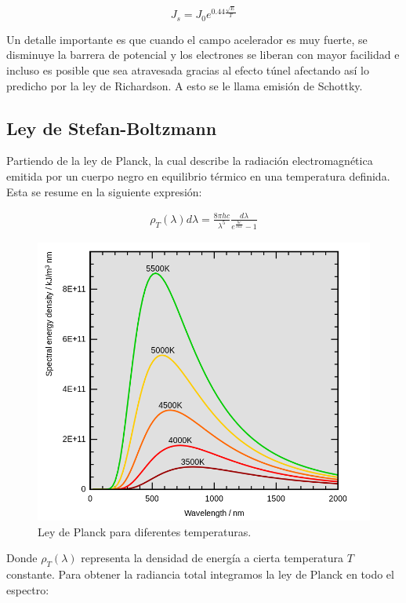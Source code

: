 \documentclass[%
 reprint,
 amsmath,amssymb,
 aps,
]{revtex4-2}
\begin{document}
\begin{equation}
    J_s=J_0e^{0.44\frac{\sqrt{E}}{T}}
    \label{eq: Densidad corriente campo cero}
\end{equation}

\vspace{0.2 cm}
 Un detalle importante es que cuando el campo acelerador es muy fuerte, se disminuye la barrera de potencial y los electrones se liberan con mayor facilidad e incluso es posible que sea atravesada gracias al efecto túnel afectando así lo predicho por la ley de Richardson. A esto se le llama emisión de Schottky.

\subsection{Ley de Stefan-Boltzmann}

Partiendo de la ley de Planck, la cual describe la radiación electromagnética emitida por un cuerpo negro en equilibrio térmico en una temperatura definida. Esta se resume en la siguiente expresión:

\begin{align*}
    \rho_{T}(\lambda)d\lambda = \frac{8\pi h c}{\lambda^{5}}\frac{d\lambda}{e^{\frac{hc}{\lambda kT}}-1}
\end{align*}

\begin{figure}[H]
    \centering
    \includegraphics[width=0.8\linewidth]{../src/imagenes/Wiens_law.png}
    \caption{Ley de Planck para diferentes temperaturas.}
    \label{fig:5}
\end{figure}


\vspace{0.2 cm}
Donde $\rho_{T}(\lambda)$ representa la densidad de energía a cierta temperatura $T$ constante. Para obtener la radiancia total integramos la ley de Planck en todo el espectro:
\end{document}
